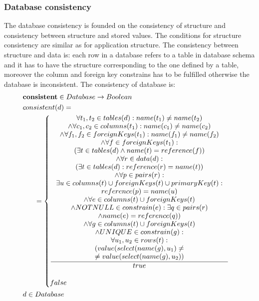 \documentclass[11pt]{article}
\begin{document}
\subsubsection{Database consistency}
The database consistency is founded on the consistency of structure and consistency between structure and stored values. The conditions for structure consistency are similar as for application structure. The consistency between structure and data is:  each row in a database  refers to a table in database schema and it has to have the structure corresponding to the one defined by a table, moreover the column and foreign key constrains has to be fulfilled  otherwise the database is inconsistent. The consistency of database is:
\begin{align*}
&	\mathbf{consistent} \in Database \rightarrow Boolean \\
&	consistent(d) = \\
& \;\;\;\;\;\; =\begin{cases}
		\inference{ \forall t_1, t_2 \in tables(d) : name(t_1) \neq name(t_2) \\ \wedge \forall c_1, c_2 \in columns(t_1) : name(c_1) \neq name(c_2) \\ \wedge \forall f_1, f_2 \in foreignKeys(t_1) : name(f_1) \neq name (f_2) \\ \wedge \forall f \in foreignKeys(t_1) : \\(\exists t \in tables(d) \wedge name(t) = reference(f)) \\ \wedge \forall r \in data(d): \\( \exists t \in tables(d) : reference(r) = name(t)) \\ \wedge \forall p \in pairs(r) :\\ \exists u \in columns(t) \cup foreignKeys(t) \cup primaryKey(t) : \\ reference(p) = name(u) \\ \wedge \forall e \in columns(t) \cup foreignKeys(t) \\ \wedge NOTNULL \in constrain(e) : \exists q \in pairs(r) \\ \wedge name(e) = reference(q)) \\ \wedge \forall g \in columns(t) \cup foreignKeys(t) \\ \wedge UNIQUE \in constrain(g) : \\ \forall u_1, u_2 \in rows(t) : \\ (value(select(name(g), u_1) \neq \\ \neq value(select(name(g), u_2)) }{true}
 	\\ \\
 	false
 \end{cases}\\
& d \in Database
\end{align*}
 
\end{document}
